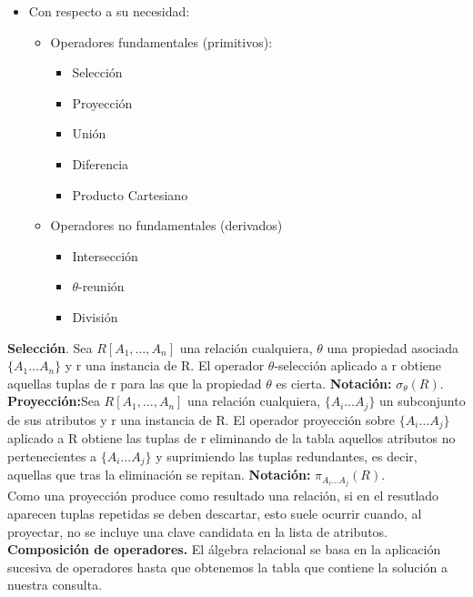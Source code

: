 \documentclass[a4paper,11pt]{article}
\begin{document}
\begin{itemize}
\item Con respecto a su necesidad:
	\begin{itemize}
		\item Operadores fundamentales (primitivos):
			\begin{itemize}
				\item Selección
				\item Proyección
				\item Unión
				\item Diferencia
				\item Producto Cartesiano
			\end{itemize}
		\item Operadores no fundamentales (derivados)
			\begin{itemize}
				\item Intersección
				\item $\theta$-reunión
				\item División
			\end{itemize}
	\end{itemize}
\end{itemize}

\textbf{Selección}. Sea $R[A_1,\ldots,A_n]$ una relación cualquiera, $\theta$ una propiedad asociada $\{A_1\ldots A_n\}$ y r una instancia de R. El operador $\theta$-selección aplicado a r obtiene aquellas tuplas de r para las que la propiedad $\theta$ es cierta. \textbf{Notación:} $\sigma_\theta(R)$. \\

\textbf{Proyección:}Sea $R[A_1,\ldots,A_n]$ una relación cualquiera, $\{A_i\ldots A_j\}$ un subconjunto de sus atributos y r una instancia de R. El operador proyección sobre $\{A_i\ldots A_j\}$ aplicado a R obtiene las tuplas de r eliminando de la tabla aquellos atributos no pertenecientes a $\{A_i\ldots A_j\}$ y suprimiendo las tuplas redundantes, es decir, aquellas que tras la eliminación se repitan. \textbf{Notación:} $\pi_{A_i\ldots A_j}(R)$. \\

Como una proyección produce como resultado una relación, si en el resutlado aparecen tuplas repetidas se deben descartar, esto suele ocurrir cuando, al proyectar, no se incluye una clave candidata en la lista de atributos. \\

\textbf{Composición de operadores.} El álgebra relacional se basa en la aplicación sucesiva de operadores hasta que obtenemos la tabla que contiene la solución a nuestra consulta. 
\end{document}
